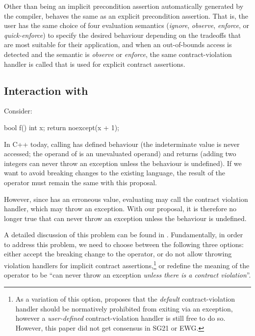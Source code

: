 Other than being an implicit precondition assertion automatically generated by the compiler,  behaves the same as an explicit precondition assertion. That is, the user has the same choice of four evaluation semantics (\emph{ignore}, \emph{observe}, \emph{enforce}, or \emph{quick-enforce}) to specify the desired behaviour depending on the tradeoffs that are most suitable for their application, and when an out-of-bounds access is detected and the semantic is \emph{observe} or \emph{enforce}, the same contract-violation handler is called that is used for explicit contract assertions.

\subsection{Interaction with }

Consider:
\begin{codeblock}
bool f() {
  int x;
  return noexcept(x + 1);
}
\end{codeblock}
In C++ today, calling  has defined behaviour (the indeterminate value is never accessed; the operand of  is an unevaluated operand) and returns  (adding two integers can never throw an exception unless the behaviour is undefined). If we want to avoid breaking changes to the existing language, the result of the  operator must remain the same with this proposal.

However, since  has an erroneous value, evaluating  may call the contract violation handler, which may throw an exception. With our proposal, it is therefore no longer true that  can never throw an exception unless the behaviour is undefined.

A detailed discussion of this problem can be found in \cite{P3541R1}. Fundamentally, in order to address this problem, we need to choose between the following three options: either accept the breaking change to the  operator, or do not allow throwing violation handlers for implicit contract assertions,\footnote{As a variation of this option, \cite{P3577R0} proposes that the \emph{default} contract-violation handler should be normatively prohibited from exiting via an exception, however a \emph{user-defined} contract-violation handler is still free to do so. However, this paper did not get consensus in SG21 or EWG.} or redefine the meaning of the  operator to be ``can never throw an exception \emph{unless there is a contract violation}''. 

